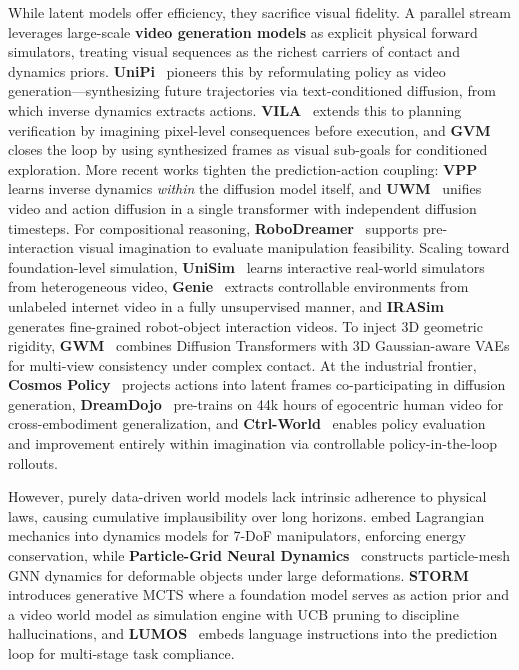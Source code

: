 \documentclass[acmsmall,screen,review,anonymous]{acmart}
\begin{document}
While latent models offer efficiency, they sacrifice visual fidelity. A parallel stream leverages large-scale \textbf{video generation models} as explicit physical forward simulators, treating visual sequences as the richest carriers of contact and dynamics priors. \textbf{UniPi}~\cite{du2023unipi} pioneers this by reformulating policy as video generation---synthesizing future trajectories via text-conditioned diffusion, from which inverse dynamics extracts actions. \textbf{VILA}~\cite{du2024vila} extends this to planning verification by imagining pixel-level consequences before execution, and \textbf{GVM}~\cite{gvm2024} closes the loop by using synthesized frames as visual sub-goals for conditioned exploration. More recent works tighten the prediction-action coupling: \textbf{VPP}~\cite{hu2025vpp} learns inverse dynamics \emph{within} the diffusion model itself, and \textbf{UWM}~\cite{zhu2025uwm} unifies video and action diffusion in a single transformer with independent diffusion timesteps. For compositional reasoning, \textbf{RoboDreamer}~\cite{zhou2024robodreamer} supports pre-interaction visual imagination to evaluate manipulation feasibility. Scaling toward foundation-level simulation, \textbf{UniSim}~\cite{yang2024unisim} learns interactive real-world simulators from heterogeneous video, \textbf{Genie}~\cite{bruce2024genie} extracts controllable environments from unlabeled internet video in a fully unsupervised manner, and \textbf{IRASim}~\cite{zhu2025irasim} generates fine-grained robot-object interaction videos. To inject 3D geometric rigidity, \textbf{GWM}~\cite{lu2025gwm} combines Diffusion Transformers with 3D Gaussian-aware VAEs for multi-view consistency under complex contact. At the industrial frontier, \textbf{Cosmos Policy}~\cite{nvidia2025cosmos} projects actions into latent frames co-participating in diffusion generation, \textbf{DreamDojo}~\cite{gao2026dreamdojo} pre-trains on 44k hours of egocentric human video for cross-embodiment generalization, and \textbf{Ctrl-World}~\cite{guo2026ctrlworld} enables policy evaluation and improvement entirely within imagination via controllable policy-in-the-loop rollouts.

However, purely data-driven world models lack intrinsic adherence to physical laws, causing cumulative implausibility over long horizons. \cite{schulze2025lagrangian} embed Lagrangian mechanics into dynamics models for 7-DoF manipulators, enforcing energy conservation, while \textbf{Particle-Grid Neural Dynamics}~\cite{zhang2025particlegrid} constructs particle-mesh GNN dynamics for deformable objects under large deformations. \textbf{STORM}~\cite{lin2025storm} introduces generative MCTS where a foundation model serves as action prior and a video world model as simulation engine with UCB pruning to discipline hallucinations, and \textbf{LUMOS}~\cite{nematollahi2025lumos} embeds language instructions into the prediction loop for multi-stage task compliance.
\end{document}

